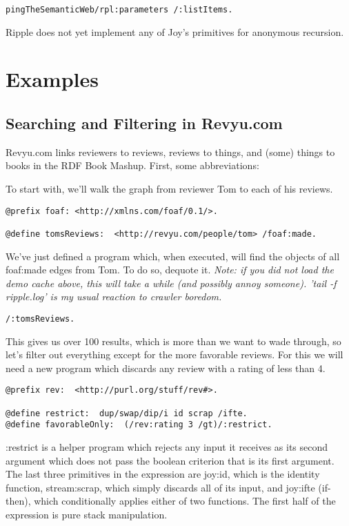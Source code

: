 \documentclass[runningheads]{llncs}
\begin{document}
\begin{verbatim}
pingTheSemanticWeb/rpl:parameters /:listItems.
\end{verbatim}

Ripple does not yet implement any of Joy's primitives for anonymous recursion.


\section{Examples}

\subsection{Searching and Filtering in Revyu.com}

Revyu.com links reviewers to reviews, reviews to things, and (some) things to
books in the RDF Book Mashup.  First, some abbreviations:

To start with, we'll walk the graph from reviewer Tom to each of his reviews.
\begin{verbatim}
@prefix foaf: <http://xmlns.com/foaf/0.1/>.

@define tomsReviews:  <http://revyu.com/people/tom> /foaf:made.
\end{verbatim}

We've just defined a program which, when executed, will find the objects of all
foaf:made edges from Tom.  To do so, dequote it.
{\it Note: if you did not load the demo cache above, this will take a while (and possibly annoy someone).  'tail -f ripple.log' is my usual reaction to crawler boredom.}

\begin{verbatim}
/:tomsReviews.
\end{verbatim}

This gives us over 100 results, which is more than we want to wade through, so let's filter out everything except for the more favorable reviews.  For this we will need a new program which discards any review with a rating of less than 4.

\begin{verbatim}
@prefix rev:  <http://purl.org/stuff/rev#>.

@define restrict:  dup/swap/dip/i id scrap /ifte.
@define favorableOnly:  (/rev:rating 3 /gt)/:restrict.
\end{verbatim}

:restrict is a helper program which rejects any input it receives as its second argument which does not pass the boolean criterion that is its first argument.  The last three primitives in the expression are joy:id, which is the identity function, stream:scrap, which simply discards all of its input, and joy:ifte (if-then), which conditionally applies either of two functions.  The first half of the expression is pure stack manipulation.
\end{document}
